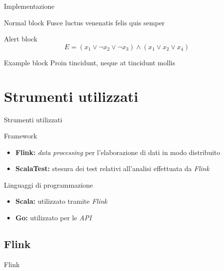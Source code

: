\documentclass{beamer}
\begin{document}
	\begin{frame}{Implementazione}
		\begin{block}{Normal block}
			Fusce luctus venenatis felis quis semper
		\end{block}

		\begin{alertblock}{Alert block}
			$$ E = (x_1 \vee \neg x_2 \vee \neg x_3) \wedge (x_1 \vee x_2 \vee x_4) $$
		\end{alertblock}

		\begin{exampleblock}{Example block}
			Proin tincidunt, neque at tincidunt mollis
		\end{exampleblock}
	\end{frame}
	
	\section{Strumenti utilizzati}

	\begin{frame}{Strumenti utilizzati}
		\begin{block}{Framework}
			\begin{itemize}
				\item \textbf{Flink:} \textit{data processing} per l'elaborazione di dati in modo distribuito \vspace{.5em}
				\item \textbf{ScalaTest:} stesura dei test relativi all'analisi effettuata da \textit{Flink} \vspace{.5em}
			\end{itemize}
		\end{block}
		
		\begin{block}{Linguaggi di programmazione}
			\begin{itemize}
				\item \textbf{Scala:} utilizzato tramite \textit{Flink} \vspace{.5em}
				\item \textbf{Go:} utilizzato per le \textit{API} \vspace{.5em}
			\end{itemize}
		\end{block}
	\end{frame}
	
	\subsection{Flink}
	\begin{frame}{Flink}
	
	\end{frame}
	
\end{document}
